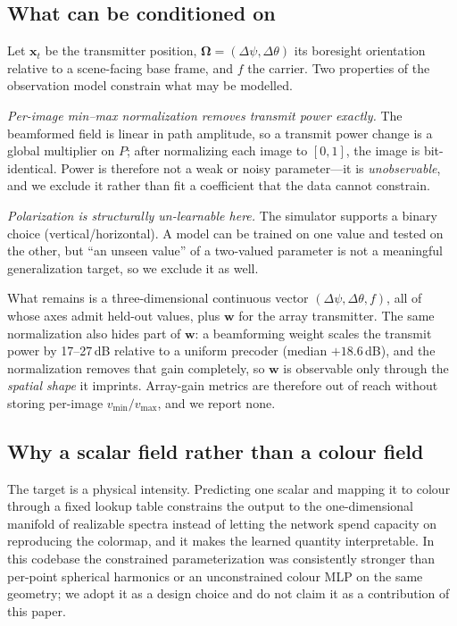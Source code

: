 \documentclass[conference]{IEEEtran}
\begin{document}
\subsection{What can be conditioned on}
\label{sec:obs}

Let $\mathbf{x}_t$ be the transmitter position, $\boldsymbol{\Omega}=
(\Delta\psi,\Delta\theta)$ its boresight orientation relative to a scene-facing
base frame, and $f$ the carrier. Two properties of the observation model
constrain what may be modelled.

\emph{Per-image min--max normalization removes transmit power exactly.}
The beamformed field is linear in path amplitude, so a transmit power change is a
global multiplier on $P$; after normalizing each image to $[0,1]$, the image is
bit-identical. Power is therefore not a weak or noisy parameter---it is
\emph{unobservable}, and we exclude it rather than fit a coefficient that the
data cannot constrain.

\emph{Polarization is structurally un-learnable here.} The simulator supports a
binary choice (vertical/horizontal). A model can be trained on one value and
tested on the other, but ``an unseen value'' of a two-valued parameter is not a
meaningful generalization target, so we exclude it as well.

What remains is a three-dimensional continuous vector
$(\Delta\psi,\Delta\theta,f)$, all of whose axes admit held-out values, plus
$\mathbf{w}$ for the array transmitter. The same normalization also hides part
of $\mathbf{w}$: a beamforming weight scales the transmit power by 17--27\,dB
relative to a uniform precoder (median $+18.6$\,dB), and the normalization
removes that gain completely, so $\mathbf{w}$ is observable only through the
\emph{spatial shape} it imprints. Array-gain metrics are therefore out of reach
without storing per-image $v_{\min}/v_{\max}$, and we report none.

\subsection{Why a scalar field rather than a colour field}

The target is a physical intensity. Predicting one scalar and mapping it to
colour through a fixed lookup table constrains the output to the
one-dimensional manifold of realizable spectra instead of letting the network
spend capacity on reproducing the colormap, and it makes the learned quantity
interpretable. In this codebase the constrained parameterization was
consistently stronger than per-point spherical harmonics or an unconstrained
colour MLP on the same geometry; we adopt it as a design choice and do not
claim it as a contribution of this paper.
\end{document}
